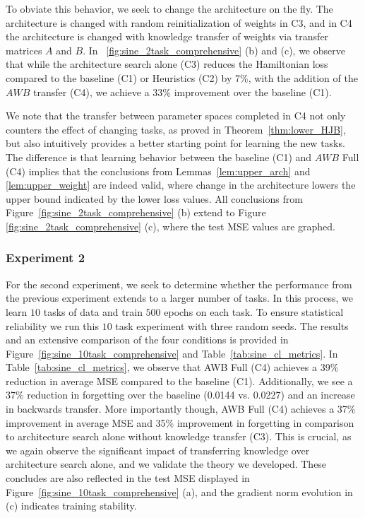 To obviate this behavior, we seek to change the architecture on the fly. The architecture is changed with random reinitialization of weights in C3, and in C4 the architecture is changed with knowledge transfer of weights via transfer matrices $A$ and $B.$ In ~\ref{fig:sine_2task_comprehensive} (b) and (c), we observe that while the architecture search alone (C3) reduces the Hamiltonian loss compared to the baseline (C1) or Heuristics (C2) by 7\%, 
with the addition of the $AWB$ transfer (C4), we achieve a 33\% improvement over the baseline (C1). 

We note that the transfer between parameter spaces completed in C4 not only counters the effect of changing tasks, as proved in Theorem~\ref{thm:lower_HJB}, but also intuitively provides a better starting point for learning the new tasks. The difference is that learning behavior between the baseline (C1) and $AWB$ Full (C4) implies that the conclusions from Lemmas~\ref{lem:upper_arch} and \ref{lem:upper_weight} are indeed valid, where change in the architecture lowers the upper bound indicated by the lower loss values. All conclusions from Figure~\ref{fig:sine_2task_comprehensive} (b) extend to Figure \ref{fig:sine_2task_comprehensive} (c), where the test MSE values are graphed.


\subsubsection{Experiment 2}
For the second experiment, we seek to determine whether  the performance from the previous experiment extends to a larger number of tasks. In this process, we learn $10$ tasks of data and train $500$ epochs on each task. To ensure statistical reliability we run this $10$ task experiment with three random seeds. The results and an extensive comparison of the four conditions is provided in Figure~\ref{fig:sine_10task_comprehensive} and Table~\ref{tab:sine_cl_metrics}. In Table~\ref{tab:sine_cl_metrics}, we observe that AWB Full (C4) achieves a 39\% reduction in average MSE compared to the baseline (C1). Additionally, we see a 37\% reduction in forgetting over the baseline (0.0144 vs. 0.0227) and an increase in backwards transfer. More importantly though, AWB Full (C4) achieves a 37\% improvement in average MSE and 35\% improvement in forgetting in comparison to architecture search alone without knowledge transfer (C3). This is crucial, as we again observe the significant impact of transferring knowledge over architecture search alone, and we validate the theory we developed. These concludes are also reflected in the test MSE displayed in Figure~\ref{fig:sine_10task_comprehensive} (a), and the gradient norm evolution in (c) indicates training stability.

